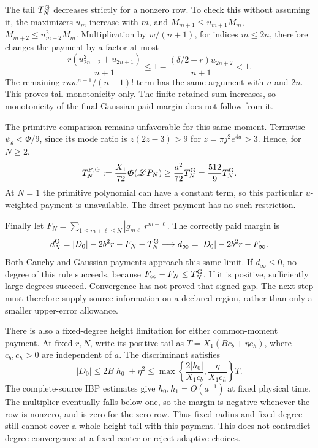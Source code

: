 \documentclass[11pt]{article}
\numberwithin{equation}{section}
\begin{document}
The tail $T_N^{\rm G}$ decreases strictly for a nonzero row. To check
this without assuming it, the maximizers $u_m$ increase with $m$, and
$M_{m+1}\le u_{m+1}M_m$, $M_{m+2}\le u_{m+2}^2M_m$.
Multiplication by $w/(n+1)$, for indices $m\le2n$, therefore changes
the payment by a factor at most
\[
 \frac{r(u_{2n+2}^2+u_{2n+1})}{n+1}
 \le1-\frac{(\delta/2-r)u_{2n+2}}{n+1}<1.
\]
The remaining $ruw^{n-1}/(n-1)!$ term has the same argument with
$n$ and $2n$. This proves tail monotonicity only. The finite retained
sum increases, so monotonicity of the final Gaussian-paid margin
does not follow from it.

The primitive comparison remains unfavorable for this same moment.
Termwise $\psi_\theta<\Phi/9$, since its mode ratio is
$z(2z-3)>9$ for $z=\pi j^2e^{4u}>3$. Hence, for $N\ge2$,
\[
 T_N^{\rm P,G}:=\frac{X_1}{72}\mathfrak G(\mathscr LP_N)
 \ge\frac{a^2}{72}T_N^{\rm G}=\frac{512}{9}T_N^{\rm G}.
\]
At $N=1$ the primitive polynomial can have a constant term, so this
particular $u$-weighted payment is unavailable. The direct payment
has no such restriction.

Finally let $F_N=\sum_{1\le m+\ell\le N}|g_{m\ell}|r^{m+\ell}$.
The correctly paid margin is
\begin{equation}\label{fcg:slackmargin}
 d_N^{\rm G}=|D_0|-2b^2r-F_N-T_N^{\rm G}
 \longrightarrow d_\infty=|D_0|-2b^2r-F_\infty.
\end{equation}
Both Cauchy and Gaussian payments approach this same limit. If
$d_\infty\le0$, no degree of this rule succeeds, because
$F_\infty-F_N\le T_N^{\rm G}$. If it is positive, sufficiently
large degrees succeed. Convergence has not proved that signed gap.
The next step must therefore supply source information on a declared
region, rather than only a smaller upper-error allowance.

There is also a fixed-degree height limitation for either common-moment
payment. At fixed $r,N$, write its positive tail as
$T=X_1(Bc_b+\eta c_h)$, where $c_b,c_h>0$ are independent of $a$.
The discriminant satisfies
\[
 |D_0|\le2B|h_0|+\eta^2
 \le\max\left\{\frac{2|h_0|}{X_1c_b},
                    \frac{\eta}{X_1c_h}\right\}T.
\]
The complete-source IBP estimates give $h_0,h_1=O(a^{-1})$ at
fixed physical time. The multiplier eventually falls below one,
so the margin is negative whenever the row is nonzero, and is zero
for the zero row. Thus fixed radius and fixed degree still cannot
cover a whole height tail with this payment. This does not contradict
degree convergence at a fixed center or reject adaptive choices.
\end{document}
